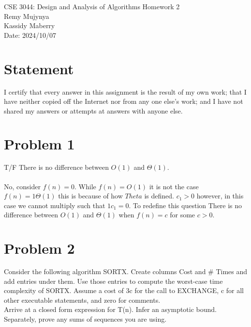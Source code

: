 \documentclass{article}
\begin{document}
\begin{center}
    {\huge
        CSE 3044: Design and Analysis of Algorithms Homework 2\\
    }
    {\large Remy Mujynya\\
          Kassidy Maberry\\}
    Date: 2024/10/07
\end{center}
\section*{Statement}
I certify that every answer in this assignment is the result of my own work; that
I have neither copied off the Internet nor from any one else's work; and I have
not shared my answers or attempts at answers with anyone else.\\

\section*{Problem 1}
T/F There is no difference between $O(1)$ and $\Theta(1)$.\\\\

No, consider $f(n) = 0$. While $f(n) = O(1)$ it is not 
the case $f(n) = 1\Theta(1)$ this is because of how $Theta$ is defined.
$c_{1} > 0$ however, in this case we cannot multiply such that $1c_{1} = 0$.
To redefine this question There is no difference between $O(1)$ and $\Theta(1)$ when 
$f(n) = c$ for some $c > 0$.\\

\section*{Problem 2}
Consider the following algorithm SORTX. Create columns Cost and \# Times and add
entries under them. Use those entries to compute the worst-case time complexity
of SORTX. Assume a cost of 3c for the call to EXCHANGE, c for all other executable
statements, and zero for comments.\\
Arrive at a closed form expression for T(n). Infer an asymptotic bound.\\
Separately, prove any sums of sequences you are using.\\\\
\end{document}

